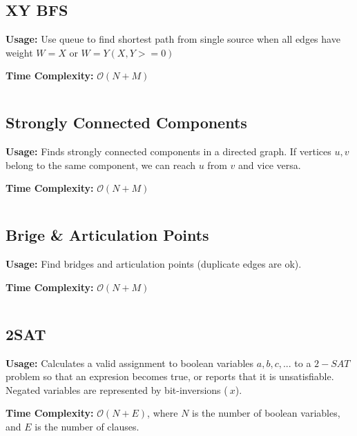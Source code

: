  \subsection{XY BFS}
    \par \textbf{Usage:} Use queue to find shortest path from single source when all edges have weight $W = X$ or $W = Y (X, Y >= 0)$
    \par \textbf{Time Complexity:} $\mathcal{O}(N + M)$
    \inputminted{cpp}{library/graphs/xy_bfs.cpp}

  \subsection{Strongly Connected Components}
    \par \textbf{Usage:} Finds strongly connected components in a directed graph.
    If vertices $u, v$ belong to the same component, we can reach $u$ from $v$ and vice versa.
    \par \textbf{Time Complexity:} $\mathcal{O}(N + M)$
    \inputminted{cpp}{library/graphs/scc.cpp}

  \subsection{Brige \& Articulation Points}
    \par \textbf{Usage:} Find bridges and articulation points (duplicate edges are ok).
    \par \textbf{Time Complexity:} $\mathcal{O}(N + M)$
    \inputminted{cpp}{library/graphs/bridge_articulationpoints.cpp}

  \subsection{2SAT}
    \par \textbf{Usage:} Calculates a valid assignment to boolean variables $a, b, c,...$ to a $2-SAT$ problem so that an expresion becomes true, or reports that it is unsatisfiable.
    Negated variables are represented by bit-inversions ($~x$).
    \par \textbf{Time Complexity:} $\mathcal{O}(N + E)$, where $N$ is the number of boolean variables, and $E$ is the number of clauses.
    \inputminted{cpp}{library/graphs/twosat.cpp}
